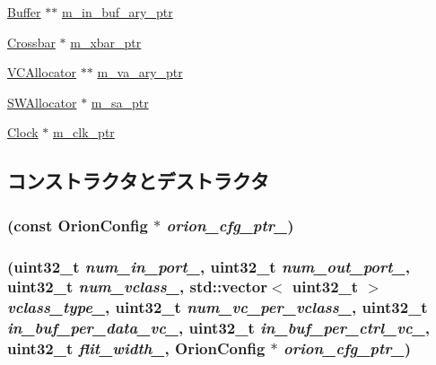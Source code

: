 \begin{DoxyCompactItemize}
\item 
\hyperlink{classBuffer}{Buffer} $\ast$$\ast$ \hyperlink{classOrionRouter_a50bb1807a619046130c388ec46facd34}{m\_\-in\_\-buf\_\-ary\_\-ptr}
\item 
\hyperlink{classCrossbar}{Crossbar} $\ast$ \hyperlink{classOrionRouter_a86f2265e1c20536cbb514637c6e82dea}{m\_\-xbar\_\-ptr}
\item 
\hyperlink{classVCAllocator}{VCAllocator} $\ast$$\ast$ \hyperlink{classOrionRouter_a58d6bd12415b8151cdaf29b4cfa244f0}{m\_\-va\_\-ary\_\-ptr}
\item 
\hyperlink{classSWAllocator}{SWAllocator} $\ast$ \hyperlink{classOrionRouter_a03598bfb038bca1b9446feca838f0eb3}{m\_\-sa\_\-ptr}
\item 
\hyperlink{classClock}{Clock} $\ast$ \hyperlink{classOrionRouter_ae79b4c9b7a5c9c992bfe2d8765843f19}{m\_\-clk\_\-ptr}
\end{DoxyCompactItemize}


\subsection{コンストラクタとデストラクタ}
\hypertarget{classOrionRouter_ade6899492dcf98912796433be31cda45}{
\subsubsection[{OrionRouter}]{ (const {\bf OrionConfig} $\ast$ {\em orion\_\-cfg\_\-ptr\_\-})}}
\label{classOrionRouter_ade6899492dcf98912796433be31cda45}
\hypertarget{classOrionRouter_ab4af4a1367755035f28a30cc3ca2e15c}{
\subsubsection[{OrionRouter}]{ ({\bf uint32\_\-t} {\em num\_\-in\_\-port\_\-}, \/  {\bf uint32\_\-t} {\em num\_\-out\_\-port\_\-}, \/  {\bf uint32\_\-t} {\em num\_\-vclass\_\-}, \/  {\bf std::vector}$<$ {\bf uint32\_\-t} $>$ {\em vclass\_\-type\_\-}, \/  {\bf uint32\_\-t} {\em num\_\-vc\_\-per\_\-vclass\_\-}, \/  {\bf uint32\_\-t} {\em in\_\-buf\_\-per\_\-data\_\-vc\_\-}, \/  {\bf uint32\_\-t} {\em in\_\-buf\_\-per\_\-ctrl\_\-vc\_\-}, \/  {\bf uint32\_\-t} {\em flit\_\-width\_\-}, \/  {\bf OrionConfig} $\ast$ {\em orion\_\-cfg\_\-ptr\_\-})}}
\label{classOrionRouter_ab4af4a1367755035f28a30cc3ca2e15c}



